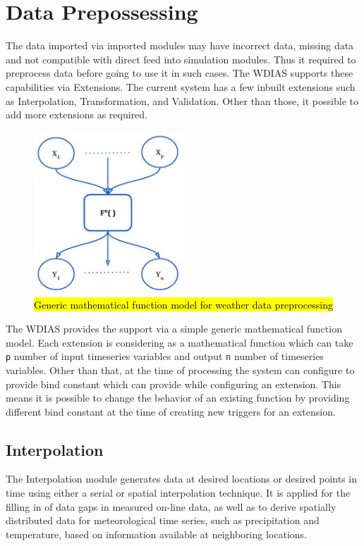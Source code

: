 \section{Data Prepossessing}
\label{se:data_preprocess}

The data imported via imported modules may have incorrect data, missing data and not compatible with direct feed into simulation modules. 
Thus it required to preprocess data before going to use it in such cases. The WDIAS supports these capabilities via Extensions. The current system has a few inbuilt extensions such as Interpolation, Transformation, and Validation. Other than those, it possible to add more extensions as required.
\begin{figure}[htp]
    \centering
    \includegraphics[width=0.5\textwidth]{method/data_preprocess/weather_data_preprocessing.jpg}
    \caption{\hl{Generic mathematical function model for weather data preprocessing}}
    \label{fi:weather_data_preprocessing}
\end{figure}

The WDIAS provides the support via a simple generic mathematical function model. Each extension is considering as a mathematical function which can take \texttt{p} number of input timeseries variables and output \texttt{n} number of timeseries variables. Other than that, at the time of processing the system can configure to provide bind constant which can provide while configuring an extension. This means it is possible to change the behavior of an existing function by providing different bind constant at the time of creating new triggers for an extension.

\subsection{Interpolation}
The Interpolation module generates data at desired locations or desired points in time using either a serial or spatial interpolation technique. It is applied for the filling in of data gaps in measured on-line data, as well as to derive spatially distributed data for meteorological time series, such as precipitation and temperature, based on information available at neighboring locations.

